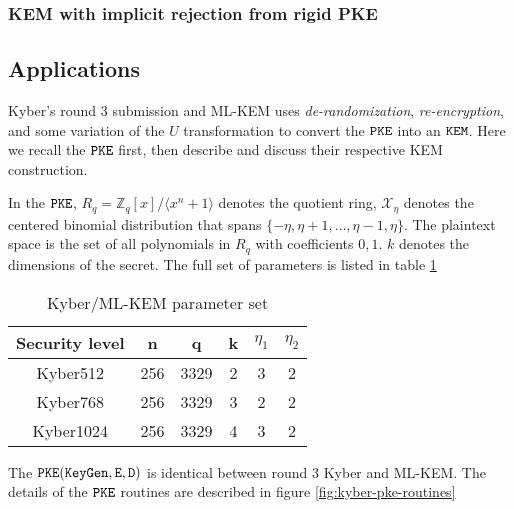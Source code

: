 \documentclass{article}
\begin{document}
\subsubsection{KEM with implicit rejection from rigid PKE}

\subsection{Applications}
Kyber's round 3 submission \cite{avanzi2019crystals} and ML-KEM \cite{key2023mechanism} uses \emph{de-randomization}, \emph{re-encryption}, and some variation of the $U$ transformation to convert the  $\texttt{PKE}$ into an  $\texttt{KEM}$. Here we recall the  $\texttt{PKE}$ first, then describe and discuss their respective KEM construction.

In the $\texttt{PKE}$, $R_q = \mathbb{Z}_q[x]/\langle x^n + 1 \rangle$ denotes the quotient ring, $\mathcal{X}_\eta$ denotes the centered binomial distribution that spans $\{-\eta, \eta+1, \ldots, \eta-1, \eta\}$. The plaintext space is the set of all polynomials in $R_q$ with coefficients $0, 1$. $k$ denotes the dimensions of the secret. The full set of parameters is listed in table \ref{tbl:kyber-params}

\begin{table}[H]
    \center
    \begin{tabular}{|c|c|c|c|c|c|}
        \hline
        Security level & n & q & k & $\eta_1$ & $\eta_2$ \\
        \hline
        Kyber512 & 256 & 3329 & 2 & 3 & 2 \\
        \hline
        Kyber768 & 256 & 3329 & 3 & 2 & 2 \\
        \hline
        Kyber1024 & 256 & 3329 & 4 & 3 & 2 \\
        \hline
    \end{tabular}
    \caption{Kyber/ML-KEM parameter set}\label{tbl:kyber-params}
\end{table}

The  $\texttt{PKE}(\texttt{KeyGen}, \texttt{E}, \texttt{D})$ is identical between round 3 Kyber and ML-KEM. The details of the $\texttt{PKE}$ routines are described in figure \ref{fig:kyber-pke-routines}
\end{document}
